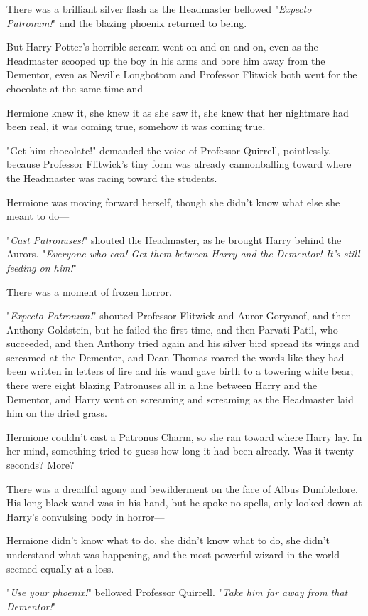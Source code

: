 There was a brilliant silver flash as the Headmaster bellowed "\emph{Expecto
Patronum!}" and the blazing phoenix returned to being.

But Harry Potter's horrible scream went on and on and on, even as the
Headmaster scooped up the boy in his arms and bore him away from the Dementor,
even as Neville Longbottom and Professor Flitwick both went for the chocolate
at the same time and—

Hermione knew it, she knew it as she saw it, she knew that her nightmare had
been real, it was coming true, somehow it was coming true.

"Get him chocolate!" demanded the voice of Professor Quirrell, pointlessly,
because Professor Flitwick's tiny form was already cannonballing toward where
the Headmaster was racing toward the students.

Hermione was moving forward herself, though she didn't know what else she meant
to do—

"\emph{Cast Patronuses!}" shouted the Headmaster, as he brought Harry behind
the Aurors. "\emph{Everyone who can! Get them between Harry and the Dementor!
It's still feeding on him!}"

There was a moment of frozen horror.

"\emph{Expecto Patronum!}" shouted Professor Flitwick and Auror Goryanof, and
then Anthony Goldstein, but he failed the first time, and then Parvati Patil,
who succeeded, and then Anthony tried again and his silver bird spread its
wings and screamed at the Dementor, and Dean Thomas roared the words like they
had been written in letters of fire and his wand gave birth to a towering white
bear; there were eight blazing Patronuses all in a line between Harry and the
Dementor, and Harry went on screaming and screaming as the Headmaster laid him
on the dried grass.

Hermione couldn't cast a Patronus Charm, so she ran toward where Harry lay. In
her mind, something tried to guess how long it had been already. Was it twenty
seconds? More?

There was a dreadful agony and bewilderment on the face of Albus Dumbledore.
His long black wand was in his hand, but he spoke no spells, only looked down
at Harry's convulsing body in horror—

Hermione didn't know what to do, she didn't know what to do, she didn't
understand what was happening, and the most powerful wizard in the world seemed
equally at a loss.

"\emph{Use your phoenix!}" bellowed Professor Quirrell. "\emph{Take him far
away from that Dementor!}"

